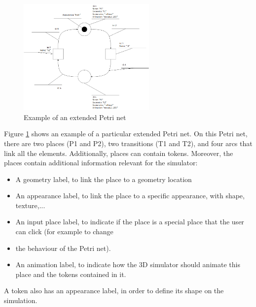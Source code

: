 \documentclass[11pt]{article}   %
\begin{document}
\begin{figure}[htp]
\begin{center}
  \includegraphics[width=0.6\textwidth]{image/example_petrinet.png}
  \caption{Example of an extended Petri net}
  \label{fig:extended_petrinet}
\end{center}
\end{figure}

Figure \ref{fig:extended_petrinet} shows an example of a particular extended Petri net. On this Petri net, there are two places (P1 and P2), two transitions (T1 and T2), and four arcs that link all the elements. Additionally, places can contain tokens. Moreover, the places contain additional information relevant for the simulator:
\begin{itemize}
\item A geometry label, to link the place to a geometry location
\item An appearance label, to link the place to a specific appearance, with shape, texture,...
\item An input place label, to indicate if the place is a special place that the user can click (for example to change \item the behaviour of the Petri net).
\item An animation label, to indicate how the 3D simulator should animate this place and the tokens contained in it.
\end{itemize}
A token also has an appearance label, in order to define its shape on the simulation.
\end{document}
